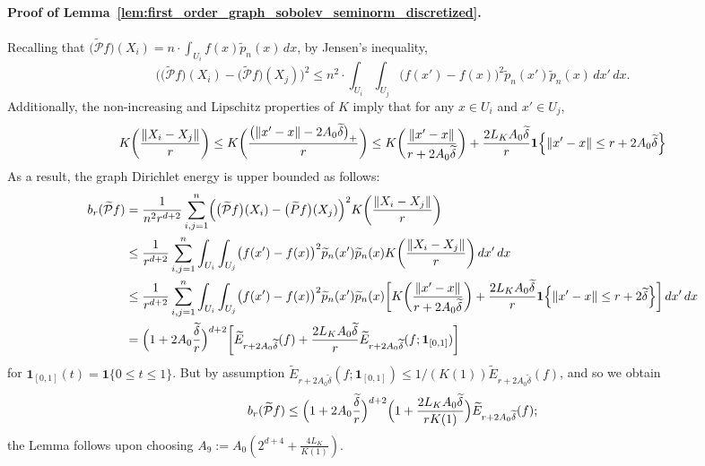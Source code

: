 \documentclass[twoside]{article}
\newcommand{\1}{\mathbf{1}}
\newcommand{\mc}[1]{\mathcal{#1}}
\newcommand{\wt}[1]{\widetilde{#1}}
\theoremstyle{definition}
\theoremstyle{remark}
\begin{document}
\paragraph{Proof of Lemma~\ref{lem:first_order_graph_sobolev_seminorm_discretized}.}
Recalling that $\bigl(\wt{\mc{P}}f\bigr)(X_i) = n \cdot \int_{U_i} f(x) \wt{p}_n(x) \,dx$, by Jensen's inequality,
\begin{equation*}
\biggl(\bigl(\wt{\mc{P}}f\bigr)(X_i) - \bigl(\wt{\mc{P}}f\bigr)(X_j)\biggr)^2 \leq n^2 \cdot \int_{U_i} \int_{U_j} \bigl(f(x') - f(x)\bigr)^2 \wt{p}_n(x') \wt{p}_n(x) \,dx' \,dx.
\end{equation*}
Additionally, the non-increasing and Lipschitz properties of $K$ imply that for any $x \in U_i$ and $x' \in U_j$, 
\begin{equation*}
K\biggl(\frac{\|X_i - X_j\|}{r}\biggr) \leq K\biggl(\frac{\bigl(\|x' - x\| - 2A_0\wt{\delta}\bigr)_{+}}{r}\biggr) \leq K\biggl(\frac{\|x' - x\|}{r + 2A_0\wt{\delta}}\biggr) + \frac{2L_KA_0\wt{\delta}}{r}\1\Bigl\{\|x' - x\| \leq r + 2A_0\wt{\delta}\Bigr\}
\end{equation*}
As a result, the graph Dirichlet energy is upper bounded as follows:
\begin{align*}
b_r(\wt{\mc{P}}f) & = \frac{1}{n^2r^{d + 2}} \sum_{i,j = 1}^n \Bigl(\bigl(\wt{\mc{P}}f\bigr)(X_i) - \bigl(\wt{P}f\bigr)(X_j)\Bigr)^2 K\biggl(\frac{\|X_i - X_j\|}{r}\biggr) \\
& \leq \frac{1}{r^{d + 2}} \sum_{i,j = 1}^n \int_{U_i} \int_{U_j}  \bigl(f(x') - f(x)\bigr)^2 \wt{p}_n(x') \wt{p}_n(x) K\biggl(\frac{\|X_i - X_j\|}{r}\biggr) \,dx' \,dx \\
& \leq \frac{1}{r^{d + 2}} \sum_{i,j = 1}^n \int_{U_i} \int_{U_j}  \bigl(f(x') - f(x)\bigr)^2 \wt{p}_n(x') \wt{p}_n(x) \biggl[K\biggl(\frac{\|x' - x\|}{r + 2A_0\wt{\delta}}\biggr) + \frac{2L_KA_0\wt{\delta}}{r}\1\Bigl\{\|x' - x\| \leq r + 2\wt{\delta}\Bigr\}\biggr] \,dx' \,dx \\
& = \Bigl(1 + 2A_0\frac{\wt{\delta}}{r}\Bigr)^{d + 2}\biggl[\wt{E}_{r + 2A_0\wt{\delta}}(f) + \frac{2L_KA_0\wt{\delta}}{r}\wt{E}_{r + 2A_0\wt{\delta}}(f; \1_{[0,1]})\biggr]
\end{align*}
for $\1_{[0,1]}(t) = \1\{0 \leq t \leq 1\}$. But by assumption $\wt{E}_{r + 2A_0\wt\delta}(f; \1_{[0,1]}) \leq 1/(K(1))\wt{E}_{r + 2A_0\wt{\delta}}(f)$, and so we obtain
\begin{equation*}
b_r(\wt{\mc{P}}f) \leq \Bigl(1 + 2A_0\frac{\wt{\delta}}{r}\Bigr)^{d + 2} \Bigl(1 + \frac{2L_KA_0\wt{\delta}}{rK(1)}\Bigr) \wt{E}_{r + 2A_0\wt{\delta}}(f);
\end{equation*}
the Lemma follows upon choosing $A_9 := A_0(2^{d + 4} + \frac{4L_K}{K(1)})$.
\end{document}

